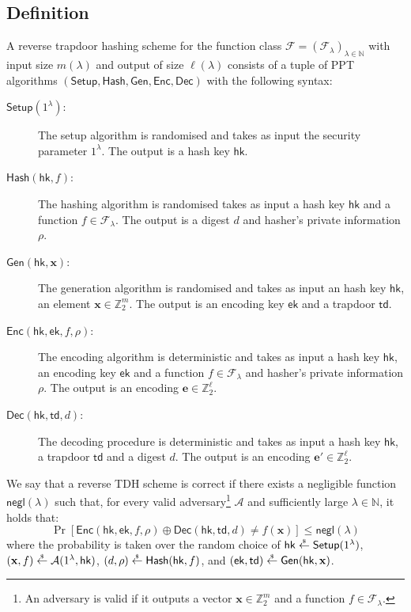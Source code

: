 \documentclass{article}
\newcommand{\ek}{\mathsf{ek}}
\newcommand{\td}{\mathsf{td}}
\newcommand{\getsr}{\overset{\raisebox{-1pt}{$\scriptscriptstyle \$$}}{\gets}}
\newcommand{\sample}{\getsr}
\newcommand{\N}{\mathbb{N}}
\newcommand{\Z}{\mathbb{Z}}
\newcommand{\negl}{\mathsf{negl}}
\renewcommand{\sec}{\ensuremath{\lambda}}
\newcommand{\Adv}{\mathcal{A}}
\newcommand{\algofont}[1]{\ensuremath{\mathsf{#1}}}
\newcommand{\Enc}{{\algofont{Enc}}}
\newcommand{\Dec}{{\algofont{Dec}}}
\newcommand{\Setup}{{\algofont{Setup}}}
\newcommand{\Gen}{{\algofont{Gen}}}
\newcommand{\Hash}{{\algofont{Hash}}}
\newcommand{\hk}{\ensuremath{\mathsf{hk}}}
\newcommand\bbbone{1}
\begin{document}
\subsection{Definition}

\begin{definition}
A reverse trapdoor hashing scheme for the function class $\mathcal{F}=(\mathcal{F}_\sec)_{\sec\in\N}$ with input size $m(\sec)$ and output of size $\ell(\sec)$ consists of a tuple of PPT algorithms $(\Setup, \Hash, \Gen, \Enc, \Dec)$ with the following syntax:
\begin{description}
\item[$\Setup(\bbbone^\sec)$:] The setup algorithm is randomised and takes as input the security parameter $\bbbone^\sec$. The output is a hash key $\hk$.
\item[$\Hash(\hk, f)$:] The hashing algorithm is randomised takes as input a hash key $\hk$ and a function $f\in\mathcal{F}_\sec$. The output is a digest $d$ and hasher's private information $\rho$.
\item[$\Gen(\hk, \mathbf{x})$:] The generation algorithm is randomised and takes as input an hash key $\hk$, an element $\mathbf{x}\in\Z_2^m$. The output is an encoding key $\ek$ and a trapdoor $\td$. 
\item[$\Enc(\hk, \ek, f, \rho)$:] The encoding algorithm is deterministic and takes as input a hash key $\hk$, an encoding key $\ek$ and a function $f\in\mathcal{F}_\sec$ and hasher's private information $\rho$. The output is an encoding $\mathbf{e}\in\Z_2^\ell$.
\item[$\Dec(\hk, \td, d)$:] The decoding procedure is deterministic and takes as input a hash key $\hk$, a trapdoor $\td$ and a digest $d$. The output is an encoding $\mathbf{e}'\in\Z_2^\ell$.
\end{description}
\end{definition}

{
\begin{definition}[Correctness]
We say that a reverse TDH scheme is correct if there exists a negligible function $\negl(\sec)$ such that, for every valid adversary\footnote{An adversary is valid if it outputs a vector $\mathbf{x}\in\Z_2^m$ and a function $f\in\mathcal{F}_\sec$.} $\Adv$ and sufficiently large $\sec\in\N$, it holds that:
\[\Pr\left[\Enc(\hk, \ek, f, \rho)\oplus \Dec(\hk, \td, d)\ne f(\mathbf{x})\right]\le \negl(\sec)\]
where the probability is taken over the random choice of $\hk\sample\Setup(\bbbone^\sec)$, $(\mathbf{x}, f)\sample\Adv(1^\sec, \hk)$, $(d,\rho)\sample\Hash(\hk, f)$, and $(\ek, \td)\sample\Gen(\hk, \mathbf{x})$.
\end{definition}}
\end{document}
